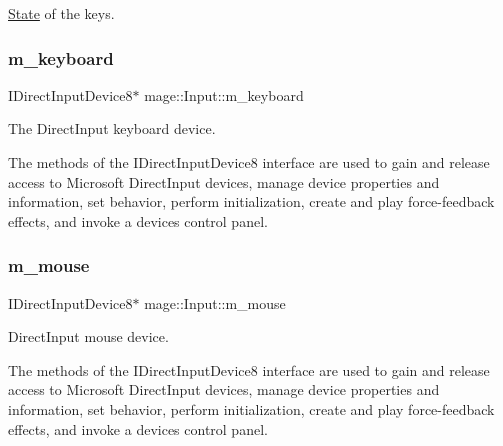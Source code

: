 \hyperlink{classmage_1_1_state}{State} of the keys. \hypertarget{classmage_1_1_input_a18ffc2becd62b77e9c4830e92cdf9999}{}\label{classmage_1_1_input_a18ffc2becd62b77e9c4830e92cdf9999} 
\subsubsection{\texorpdfstring{m\+\_\+keyboard}{m\_keyboard}}
{\footnotesize\ttfamily I\+Direct\+Input\+Device8$\ast$ mage\+::\+Input\+::m\+\_\+keyboard\hspace{0.3cm}{\ttfamily [private]}}

The Direct\+Input keyboard device.

The methods of the I\+Direct\+Input\+Device8 interface are used to gain and release access to Microsoft Direct\+Input devices, manage device properties and information, set behavior, perform initialization, create and play force-\/feedback effects, and invoke a device\textquotesingle{}s control panel. \hypertarget{classmage_1_1_input_ab62252cea073f7f0fae71ad4cb76a288}{}\label{classmage_1_1_input_ab62252cea073f7f0fae71ad4cb76a288} 
\subsubsection{\texorpdfstring{m\+\_\+mouse}{m\_mouse}}
{\footnotesize\ttfamily I\+Direct\+Input\+Device8$\ast$ mage\+::\+Input\+::m\+\_\+mouse\hspace{0.3cm}{\ttfamily [private]}}

Direct\+Input mouse device.

The methods of the I\+Direct\+Input\+Device8 interface are used to gain and release access to Microsoft Direct\+Input devices, manage device properties and information, set behavior, perform initialization, create and play force-\/feedback effects, and invoke a device\textquotesingle{}s control panel. \hypertarget{classmage_1_1_input_accf558cd7da26ec27b24fde21627a07e}{}\label{classmage_1_1_input_accf558cd7da26ec27b24fde21627a07e} 

